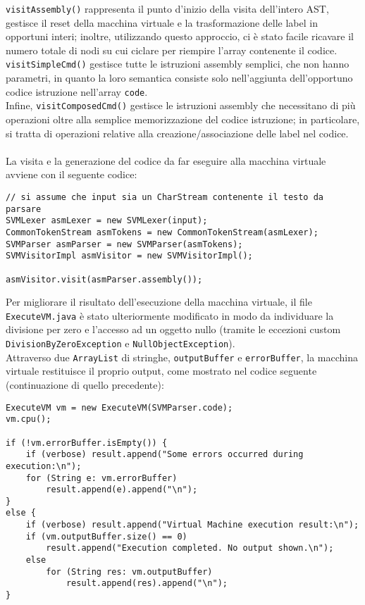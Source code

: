 \documentclass[a4paper]{article}   %
\begin{document}
\lstinline|visitAssembly()| rappresenta il punto d'inizio della visita dell'intero AST, gestisce il reset della macchina virtuale e la trasformazione delle label in opportuni interi; inoltre, utilizzando questo approccio, ci è stato facile ricavare il numero totale di nodi su cui ciclare per riempire l'array contenente il codice.\\
\lstinline|visitSimpleCmd()| gestisce tutte le istruzioni assembly semplici, che non hanno parametri, in quanto la loro semantica consiste solo nell'aggiunta dell'opportuno codice istruzione nell'array \lstinline|code|.\\
Infine, \lstinline|visitComposedCmd()| gestisce le istruzioni assembly che necessitano di più operazioni oltre alla semplice memorizzazione del codice istruzione; in particolare, si tratta di operazioni relative alla creazione/associazione delle label nel codice.\\\\
La visita e la generazione del codice da far eseguire alla macchina virtuale avviene con il seguente codice:
\begin{lstlisting}[basicstyle=\footnotesize\ttfamily]
// si assume che input sia un CharStream contenente il testo da parsare
SVMLexer asmLexer = new SVMLexer(input);
CommonTokenStream asmTokens = new CommonTokenStream(asmLexer);
SVMParser asmParser = new SVMParser(asmTokens);
SVMVisitorImpl asmVisitor = new SVMVisitorImpl();

asmVisitor.visit(asmParser.assembly());
\end{lstlisting}
Per migliorare il risultato dell'esecuzione della macchina virtuale, il file \lstinline|ExecuteVM.java| è stato ulteriormente modificato in modo da individuare la divisione per zero e l'accesso ad un oggetto nullo (tramite le eccezioni custom \lstinline|DivisionByZeroException| e \lstinline|NullObjectException|).\\
Attraverso due \lstinline|ArrayList| di stringhe, \lstinline|outputBuffer| e \lstinline|errorBuffer|, la macchina virtuale restituisce il proprio output, come mostrato nel codice seguente (continuazione di quello precedente):
\begin{lstlisting}[basicstyle=\footnotesize\ttfamily]
ExecuteVM vm = new ExecuteVM(SVMParser.code);
vm.cpu();

if (!vm.errorBuffer.isEmpty()) {
	if (verbose) result.append("Some errors occurred during execution:\n");
	for (String e: vm.errorBuffer)
		result.append(e).append("\n");
}
else {
	if (verbose) result.append("Virtual Machine execution result:\n");
	if (vm.outputBuffer.size() == 0)
		result.append("Execution completed. No output shown.\n");
	else
		for (String res: vm.outputBuffer)
			result.append(res).append("\n");
}
\end{lstlisting}
\end{document}
